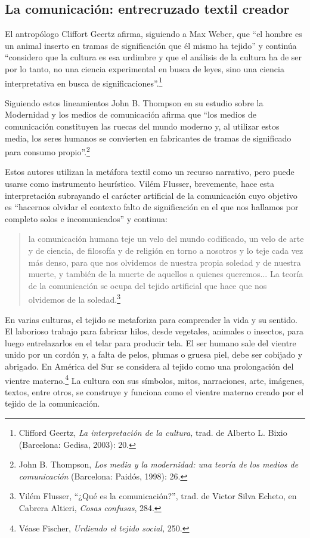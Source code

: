 \documentclass{tufte-handout}
\begin{document}
\hypertarget{la-comunicacin-entrecruzado-textil-creador}{%
\subsection{La comunicación: entrecruzado
textil
creador}\label{la-comunicacin-entrecruzado-textil-creador}}

El antropólogo Cliffort Geertz afirma, siguiendo a Max Weber, que ``el
hombre es un animal inserto en tramas de significación que él mismo ha
tejido'' y continúa ``considero que la cultura es esa urdimbre y que el
análisis de la cultura ha de ser por lo tanto, no una ciencia
experimental en busca de leyes, sino una ciencia interpretativa en busca
de significaciones''.\footnote{Clifford Geertz, \emph{La interpretación
  de la cultura,} trad. de Alberto L. Bixio (Barcelona: Gedisa, 2003):
  20.}

Siguiendo estos lineamientos John B. Thompson en su estudio sobre la
Modernidad y los medios de comunicación afirma que ``los medios de
comunicación constituyen las ruecas del mundo moderno y, al utilizar
estos media, los seres humanos se convierten en fabricantes de tramas de
significado para consumo propio''.\footnote{John B. Thompson, \emph{Los
  media y la modernidad: una teoría de los medios de comunicación}
  (Barcelona: Paidós, 1998): 26.}

Estos autores utilizan la metáfora textil como un recurso narrativo,
pero puede usarse como instrumento heurístico. Vilém Flusser,
brevemente, hace esta interpretación subrayando el carácter artificial
de la comunicación cuyo objetivo es ``hacernos olvidar el contexto falto
de significación en el que nos hallamos por completo solos e
incomunicados'' y continua:

\begin{quote}
la comunicación humana teje un velo del mundo codificado, un velo de
arte y de ciencia, de filosofía y de religión en torno a nosotros y lo
teje cada vez más denso, para que nos olvidemos de nuestra propia
soledad y de nuestra muerte, y también de la muerte de aquellos a
quienes queremos... La teoría de la comunicación se ocupa del tejido
artificial que hace que nos olvidemos de la soledad.\footnote{Vilém
  Flusser, ``¿Qué es la comunicación?'', trad. de Victor Silva Echeto,
  en Cabrera Altieri, \emph{Cosas confusas}, 284.}
\end{quote}

En varias culturas, el tejido se metaforiza para comprender la vida y su
sentido. El laborioso trabajo para fabricar hilos, desde vegetales,
animales o insectos, para luego entrelazarlos en el telar para producir
tela. El ser humano sale del vientre unido por un cordón y, a falta de
pelos, plumas o gruesa piel, debe ser cobijado y abrigado. En América
del Sur se considera al tejido como una prolongación del vientre
materno.\footnote{Véase Fischer, \emph{Urdiendo el tejido social,} 250.}
La cultura con sus símbolos, mitos, narraciones, arte, imágenes, textos,
entre otros, se construye y funciona como el vientre materno creado por
el tejido de la comunicación.
\end{document}

